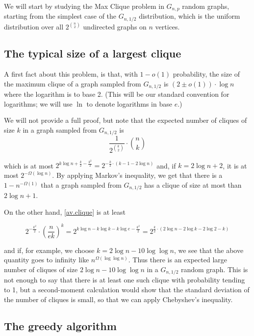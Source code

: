 We will start by studying the Max Clique problem in $G_{n,p}$ random graphs, starting from the simplest case of
the $G_{n,1/2}$ distribution, which is the uniform distribution over all $2^{{n\choose 2}}$ undirected graphs on $n$ vertices.

\subsection{The typical size of a largest clique}

A first fact about this problem, is that, with $1-o(1)$ probability, the size of the maximum clique of a graph sampled from
$G_{n,1/2}$ is $(2 \pm o(1)) \cdot \log n$ where the logarithm is to base 2. (This will be our standard convention for logarithms;
we will use $\ln$ to denote logarithms in base $e$.)

We will not provide a full proof, but note that the expected number of cliques of size $k$ in a graph sampled from $G_{n,1/2}$ is
\begin{equation} \label{av.clique}
\frac 1 {2^{{k \choose 2}}} \cdot {n \choose k }
\end{equation}

 which is at most $2^{k\log n + \frac k2 - \frac {k^2} 2} = 2^{- \frac k2 \cdot (k - 1 - 2\log n)}$ and, if $k = 2\log n + 2$, it is at most $2^{- \Omega(\log n)}$. By applying Markov's inequality, we get that there is a $ 1- n^{-\Omega(1)}$ that a graph sampled from $G_{n,1/2}$ has a clique of size at most than $2\log n + 1$.
 
 On the other hand, \eqref{av.clique} is at least
 
 \[ 2^{-\frac {k^2} 2} \cdot \left( \frac n {ek} \right)^k = 2^{k \log n - k\log k - k \log e - \frac {k^2}2 } = 2^{\frac k2 \cdot (2\log n - 2\log k - 2 \log 2 -  k)}\]
 
 and if, for example, we choose $k = 2 \log n - 10\log\log n$, we see that the above quantity goes to infinity like $n^{\Omega(\log\log n)}$. Thus there is an expected large number of cliques of size $2\log n - 10\log\log n$ in a $G_{n,1/2}$ random graph. This is not enough to say that there is at least one such clique with probability tending to 1, but a second-moment calculation would show that the standard deviation of the number of cliques is small, so that we can apply Chebyshev's inequality.
 
 \subsection{The greedy algorithm}
 
